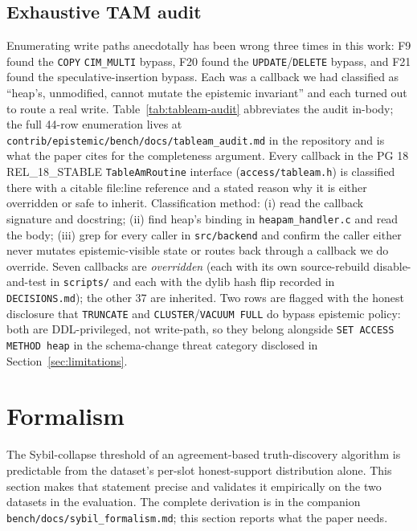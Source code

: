 \documentclass[sigconf, nonacm]{acmart}
\begin{document}
\subsection{Exhaustive TAM audit}
\label{sec:tableam-audit}
Enumerating write paths anecdotally has been wrong three times in this work: F9 found the \texttt{COPY} \texttt{CIM\_MULTI} bypass, F20 found the \texttt{UPDATE}/\texttt{DELETE} bypass, and F21 found the speculative-insertion bypass. Each was a callback we had classified as ``heap's, unmodified, cannot mutate the epistemic invariant'' and each turned out to route a real write. Table~\ref{tab:tableam-audit} abbreviates the audit in-body; the full 44-row enumeration lives at \texttt{contrib/epistemic/bench/docs/tableam\_audit.md} in the repository and is what the paper cites for the completeness argument. Every callback in the PG 18 REL\_18\_STABLE \texttt{TableAmRoutine} interface (\texttt{access/tableam.h}) is classified there with a citable file:line reference and a stated reason why it is either overridden or safe to inherit. Classification method: (i) read the callback signature and docstring; (ii) find heap's binding in \texttt{heapam\_handler.c} and read the body; (iii) grep for every caller in \texttt{src/backend} and confirm the caller either never mutates epistemic-visible state or routes back through a callback we do override. Seven callbacks are \emph{overridden} (each with its own source-rebuild disable-and-test in \texttt{scripts/} and each with the dylib hash flip recorded in \texttt{DECISIONS.md}); the other 37 are inherited. Two rows are flagged with the honest disclosure that \texttt{TRUNCATE} and \texttt{CLUSTER}/\texttt{VACUUM FULL} do bypass epistemic policy: both are DDL-privileged, not write-path, so they belong alongside \texttt{SET ACCESS METHOD heap} in the schema-change threat category disclosed in Section~\ref{sec:limitations}.



\section{Formalism}
\label{sec:formalism}

The Sybil-collapse threshold of an agreement-based truth-discovery algorithm is predictable from the dataset's per-slot honest-support distribution alone. This section makes that statement precise and validates it empirically on the two datasets in the evaluation. The complete derivation is in the companion \texttt{bench/docs/sybil\_formalism.md}; this section reports what the paper needs.
\end{document}
